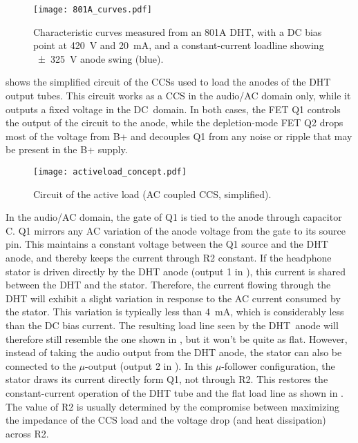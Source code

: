 \begin{figure}
\begin{center}
\texttt{[image: 801A\_curves.pdf]}
\caption{Characteristic curves measured from an 801A DHT, with a DC bias point at \SI{420}{V} and \SI{20}{mA}, and a constant-current loadline showing \SI{\pm325}{V} anode swing (blue).}
\end{center}
\end{figure}

 shows the simplified circuit of the CCSs used to load the anodes of the DHT output tubes. This circuit works as a CCS in the audio/AC domain only, while it outputs a fixed voltage in the DC domain. In both cases, the FET Q1 controls the output of the circuit to the anode, while the depletion-mode FET Q2 drops most of the voltage from B+ and decouples Q1 from any noise or ripple that may be present in the B+ supply.\par

\begin{figure}
\begin{center}
\texttt{[image: activeload\_concept.pdf]}
\caption{Circuit of the active load (AC coupled CCS, simplified).}
\end{center}
\end{figure}

In the audio/AC domain, the gate of Q1 is tied to the anode through capacitor C. Q1 mirrors any AC variation of the anode voltage from the gate to its source pin. This maintains a constant voltage between the Q1 source and the DHT anode, and thereby keeps the current through R2 constant. If the headphone stator is driven directly by the DHT anode (output 1 in ), this current is shared between the DHT and the stator. Therefore, the current flowing through the DHT will exhibit a slight variation in response to the AC current consumed by the stator. This variation is typically less than \SI{4}{mA}\cite{osdeha_p8}, which is considerably less than the DC bias current. The resulting load line seen by the DHT anode will therefore still resemble the one shown in , but it won't be quite as flat. However, instead of taking the audio output from the DHT anode, the stator can also be connected to the $\mu$-output (output 2 in ). In this $\mu$-follower configuration\cite{pimm_ccs,kimmel_mustage}, the stator draws its current directly form Q1, not through R2. This restores the constant-current operation of the DHT tube and the flat load line as shown in . The value of R2 is usually determined by the compromise between maximizing the impedance of the CCS load and the voltage drop (and heat dissipation) across R2.\cite{muresistorvalue}\par

